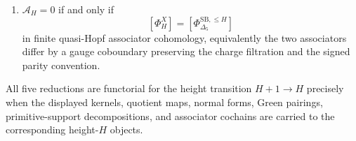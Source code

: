 \begin{theorem}
\begin{enumerate}[label=\textup{(\alph*)}]
support is
\[
 \operatorname{Prim}\!\left(
 D^{\mathrm{red},\leq H}_\hbar(K3\times E,\sigma)
 \right)_0
 =
 \mathfrak h^{\leq H}_{\mathrm{Cartan}}
 \oplus
 \mathfrak z^{\mathrm{dyn},\leq H}
\]
and centrality against every retained root generator forces the Cartan
component into
\(\mathfrak r^{0,\leq H}_{\Delta_5}\).
\item \(\mathcal A_H=0\) if and only if
\[
 [\Phi^X_H]=[\Phi^{\mathrm{SB},\leq H}_{\Delta_5}]
\]
in finite quasi-Hopf associator cohomology, equivalently the two
associators differ by a gauge coboundary preserving the charge
filtration and the signed parity convention.
\end{enumerate}
All five reductions are functorial for the height transition
\(H+1\to H\) precisely when the displayed kernels, quotient maps,
normal forms, Green pairings, primitive-support decompositions, and
associator cochains are carried to the corresponding height-\(H\)
objects.
\end{theorem}

